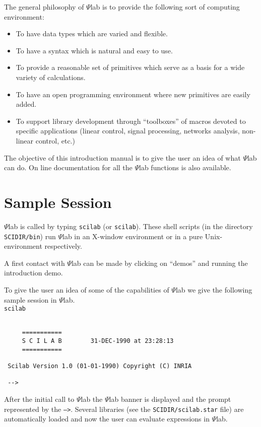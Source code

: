 	The general philosophy of $\Psi$lab is to provide the following
sort of computing environment:
\begin{itemize}
   \item To have data types which are varied and flexible.
   \item To have a syntax which is natural and easy to use.
   \item To provide a reasonable set of primitives which serve
	   as a basis for a wide variety of calculations.
   \item To have an open programming environment where new
	   primitives are easily added.
   \item To support library development through ``toolboxes'' of
         macros devoted to specific
	   applications (linear control, signal processing, 
	   networks analysis, non-linear control, etc.)
\end{itemize}

	The objective of this introduction manual is to give the user 
an idea of what $\Psi$lab can do. On line documentation for all the
$\Psi$lab functions is also available.

\section{Sample Session}

$\Psi$lab is called by typing {\tt scilab} (or {\tt scilab}).
These shell scripts  (in the directory {\tt SCIDIR/bin}) run $\Psi$lab 
in an X-window environment or in a pure Unix-environment respectively.

A first contact with $\Psi$lab can be made by clicking on ``demos''
and running the introduction demo.

	To give the user an idea of some of the capabilities of $\Psi$lab
we give the following sample session in $\Psi$lab.\\
\bigskip
{\tt scilab}
\begin{verbatim}

     ===========
     S C I L A B        31-DEC-1990 at 23:28:13 
     ===========

 Scilab Version 1.0 (01-01-1990) Copyright (C) INRIA
   
 -->

\end{verbatim}
After the initial call to $\Psi$lab the $\Psi$lab banner is displayed
and the prompt represented by the {\tt -->}.  Several libraries
(see the {\tt SCIDIR/scilab.star} file) are automatically loaded and 
now the user can evaluate expressions in $\Psi$lab.

